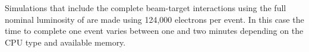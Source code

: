 \noindent Simulations that include the complete beam-target interactions using the full nominal luminosity
of \cLuminosity are made using 124,000 electrons per event. In this case the time to complete one event varies
between one and two minutes depending on the CPU type and available memory.

































